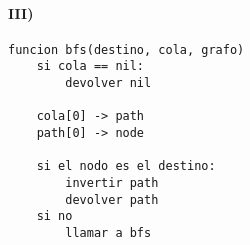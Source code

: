 \documentclass{aitemplate}
\begin{document}
\paragraph{III)}
\begin{lstlisting}
funcion bfs(destino, cola, grafo)
	si cola == nil:
		devolver nil
	
	cola[0] -> path
	path[0] -> node
	
	si el nodo es el destino:
		invertir path
		devolver path
	si no
		llamar a bfs
	
\end{lstlisting}
\end{document}
